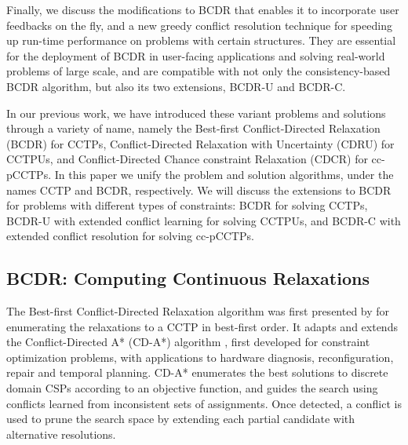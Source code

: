 \documentclass[jair,twoside,11pt,theapa]{article}
\begin{document}
%
%
%
%
%


Finally, we discuss the modifications to BCDR that enables it to incorporate
user feedbacks on the fly, and a new greedy conflict resolution technique for
speeding up run-time performance on problems with certain structures. They are
essential for the deployment of BCDR in user-facing applications and solving
real-world problems of large scale, and are compatible with not only the consistency-based BCDR algorithm, but also its two extensions, BCDR-U and BCDR-C.


%
%
%

%
%


In our previous work, we have introduced these variant problems and solutions
through a variety of name, namely the Best-first Conflict-Directed Relaxation
(BCDR) \cite{Yu_BCDR_2013} for CCTPs, Conflict-Directed Relaxation with
Uncertainty (CDRU) \cite{Yu_CDRU_2014} for CCTPUs, and Conflict-Directed Chance
constraint Relaxation (CDCR) \cite{Yu_AAAI_2015} for cc-pCCTPs. In this paper we
unify the problem and solution algorithms, under the names CCTP and BCDR,
respectively. We will discuss the extensions to BCDR for problems with different
types of constraints: BCDR for solving CCTPs, BCDR-U with extended conflict
learning for solving CCTPUs, and BCDR-C with extended conflict resolution for
solving cc-pCCTPs.


\subsection{BCDR: Computing Continuous Relaxations}


The Best-first Conflict-Directed Relaxation algorithm was first presented by
 for enumerating the relaxations to a CCTP in best-first
order. It adapts and extends the Conflict-Directed A* (CD-A*) algorithm
\cite{Williams_CDAstar_2002}, first developed for constraint optimization problems,
with applications to hardware diagnosis, reconfiguration, repair and temporal
planning. CD-A* enumerates the best solutions to discrete domain CSPs according
to an objective function, and guides the search using conflicts learned from
inconsistent sets of assignments. Once detected, a conflict is used to prune the
search space by extending each partial candidate with alternative resolutions.
\end{document}
